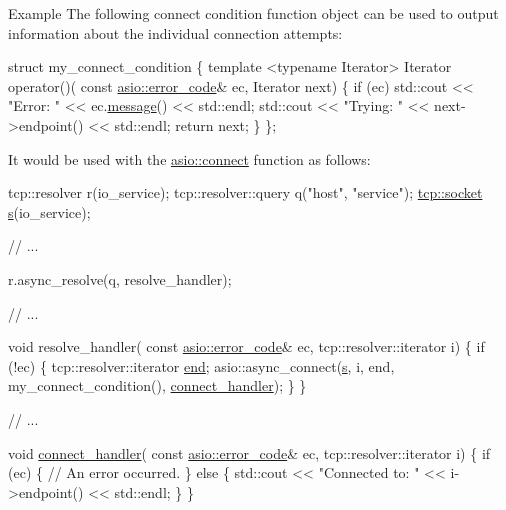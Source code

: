 \begin{DoxyParagraph}{Example}
The following connect condition function object can be used to output information about the individual connection attempts\+: 
\begin{DoxyCode}
 \textcolor{keyword}{struct }my\_connect\_condition
\{
  \textcolor{keyword}{template} <\textcolor{keyword}{typename} Iterator>
  Iterator operator()(
      \textcolor{keyword}{const} \hyperlink{classasio_1_1error__code}{asio::error\_code}& ec,
      Iterator next)
  \{
    \textcolor{keywordflow}{if} (ec) std::cout << \textcolor{stringliteral}{"Error: "} << ec.\hyperlink{classasio_1_1error__code_a9e15b346b9ec23275530835d9c150711}{message}() << std::endl;
    std::cout << \textcolor{stringliteral}{"Trying: "} << next->endpoint() << std::endl;
    \textcolor{keywordflow}{return} next;
  \}
\}; 
\end{DoxyCode}
 It would be used with the \hyperlink{group__connect_ga29acd61d7a875cef7dbd1f892be2906c}{asio\+::connect} function as follows\+: 
\begin{DoxyCode}
 tcp::resolver r(io\_service);
tcp::resolver::query q(\textcolor{stringliteral}{"host"}, \textcolor{stringliteral}{"service"});
\hyperlink{namespacewebsocketpp_1_1transport_1_1asio_1_1socket_1_1error_a828ddaa5ed63a761e1b557465a35f05aa0c31b356014843e1d09514e794a539a7}{tcp::socket} \hyperlink{group__async__connect_ga31ab74b9ea6c77932dddd016cfc7920a}{s}(io\_service);

\textcolor{comment}{// ...}

r.async\_resolve(q, resolve\_handler);

\textcolor{comment}{// ...}

\textcolor{keywordtype}{void} resolve\_handler(
    \textcolor{keyword}{const} \hyperlink{classasio_1_1error__code}{asio::error\_code}& ec,
    tcp::resolver::iterator i)
\{
  \textcolor{keywordflow}{if} (!ec)
  \{
    tcp::resolver::iterator \hyperlink{group__async__connect_gadb6ad0193229ae84828688e812cd325c}{end};
    asio::async\_connect(\hyperlink{group__async__connect_ga31ab74b9ea6c77932dddd016cfc7920a}{s}, i, end,
        my\_connect\_condition(),
        \hyperlink{namespacewebsocketpp_1_1transport_ac392fca34e946b48414278c0c3addfa5}{connect\_handler});
  \}
\}

\textcolor{comment}{// ...}

\textcolor{keywordtype}{void} \hyperlink{namespacewebsocketpp_1_1transport_ac392fca34e946b48414278c0c3addfa5}{connect\_handler}(
    \textcolor{keyword}{const} \hyperlink{classasio_1_1error__code}{asio::error\_code}& ec,
    tcp::resolver::iterator i)
\{
  \textcolor{keywordflow}{if} (ec)
  \{
    \textcolor{comment}{// An error occurred.}
  \}
  \textcolor{keywordflow}{else}
  \{
    std::cout << \textcolor{stringliteral}{"Connected to: "} << i->endpoint() << std::endl;
  \}
\} 
\end{DoxyCode}
 
\end{DoxyParagraph}
